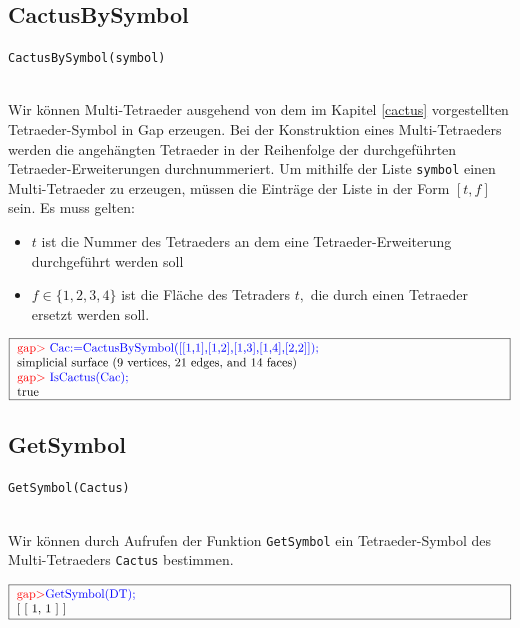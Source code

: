 \documentclass[12pt,titlepage,twoside,cleardoublepage]{article}
\theoremstyle{nummermitklammern}
\numberwithin{equation}{section}
\begin{document}
\subsection{CactusBySymbol}
\begin{large}
\texttt{CactusBySymbol(symbol)}
\end{large}\\
Wir können Multi-Tetraeder ausgehend von dem im Kapitel \ref{cactus} vorgestellten Tetraeder-Symbol in Gap erzeugen.
Bei der Konstruktion eines Multi-Tetraeders werden die angehängten Tetraeder in der Reihenfolge der durchgeführten Tetraeder-Erweiterungen durchnummeriert.
Um mithilfe der Liste \texttt{symbol} einen Multi-Tetraeder zu erzeugen, müssen die Einträge der Liste in der Form $[t,f]$ sein. Es muss gelten:
\begin{itemize}
\item $t$ ist die Nummer des Tetraeders an dem eine Tetraeder-Erweiterung durchgeführt werden soll
\item $f\in  \{1,2,3,4\}$ ist die Fläche des Tetraders $t,$ die durch einen Tetraeder ersetzt werden soll.  
\end{itemize}
\begin{center}
$\fbox{
\parbox{14cm}{
\textcolor{red}{gap$>$} \textcolor{blue}{Cac:=CactusBySymbol([[1,1],[1,2],[1,3],[1,4],[2,2]]);}\newline
simplicial surface (9 vertices, 21 edges, and 14 faces)\newline
\textcolor{red}{gap$>$} \textcolor{blue}{IsCactus(Cac);}\newline
true
}
}$
\end{center}
\subsection{GetSymbol}
\begin{large}
\texttt{GetSymbol(Cactus)}
\end{large}\\
Wir können durch Aufrufen der Funktion \texttt{GetSymbol} ein Tetraeder-Symbol des Multi-Tetraeders \texttt{Cactus} bestimmen.
\begin{center}
$\fbox{
\parbox{14cm}{
\textcolor{red}{gap$>$}\textcolor{blue}{GetSymbol(DT);}\newline
[ [ 1, 1 ] ]
}
}$
\end{center}
\end{document}
